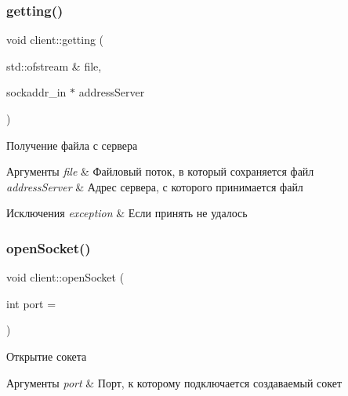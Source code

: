 \subsubsection{\texorpdfstring{getting()}{getting()}}
{\footnotesize\ttfamily void client\+::getting (\begin{DoxyParamCaption}\item[{std\+::ofstream \&}]{file,  }\item[{sockaddr\+\_\+in $\ast$}]{address\+Server }\end{DoxyParamCaption})\hspace{0.3cm}{\ttfamily [private]}}



Получение файла с сервера 


\begin{DoxyParams}{Аргументы}
{\em file} & Файловый поток, в который сохраняется файл \\
\hline
{\em address\+Server} & Адрес сервера, с которого принимается файл \\
\hline
\end{DoxyParams}

\begin{DoxyExceptions}{Исключения}
{\em exception} & Если принять не удалось \\
\hline
\end{DoxyExceptions}
\mbox{\label{classclient_a7fc29fda7ffe4db7d5d83505f8be001b}} 
\subsubsection{\texorpdfstring{open\+Socket()}{openSocket()}}
{\footnotesize\ttfamily void client\+::open\+Socket (\begin{DoxyParamCaption}\item[{int}]{port = {} }\end{DoxyParamCaption})\hspace{0.3cm}{\ttfamily [private]}}



Открытие сокета 


\begin{DoxyParams}{Аргументы}
{\em port} & Порт, к которому подключается создаваемый сокет \\
\hline
\end{DoxyParams}

